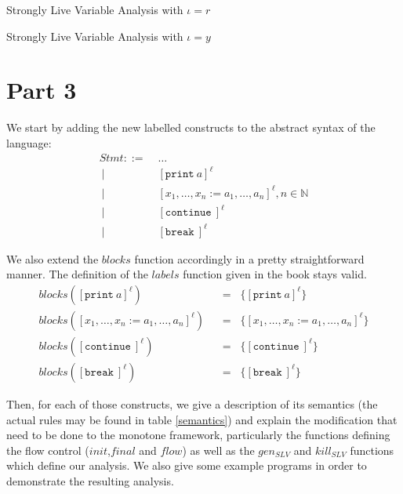 \documentclass[a4wide,12pt]{article}
\def\eq{\;\; = \;\;}
\def\N{\mathbb{N}}
\def\print{\texttt{print}\ }
\def\cont {\texttt{continue}\ }
\def\break{\texttt{break}\ }
\begin{document}
\begin{table}
\caption{Strongly Live Variable Analysis with $\iota = r$}
\begin{sideways}
\tiny

\end{sideways}
\end{table}
\begin{table}
\caption{Strongly Live Variable Analysis with $\iota = y$}
\begin{sideways}

\end{sideways}
\end{table}
 
\section{Part 3}
 
We start by adding the new labelled constructs to the abstract syntax of the language:
\begin{align*}
 Stmt ::= \; & \ldots \\
 ~ |\;\; & [\print a]^\ell \\
 ~ |\;\; & [x_1,\ldots,x_n := a_1,\ldots,a_n]^\ell , n \in \N \\
 ~ |\;\; & [\cont]^\ell \\
 ~ |\;\; & [\break]^\ell
\end{align*}
 
We also extend the $blocks$ function accordingly in a pretty straightforward manner. The definition
of the $labels$ function given in the book stays valid.
\begin{align*}
 blocks([\print a]^\ell) & \eq \{[\print a]^\ell\} \\
 blocks([x_1,\ldots,x_n := a_1,\ldots,a_n]^\ell) & \eq \{[x_1,\ldots,x_n := a_1,\ldots,a_n]^\ell\} \\
 blocks([\cont]^\ell) & \eq \{[\cont]^\ell\} \\
 blocks([\break]^\ell) & \eq \{[\break]^\ell\}
\end{align*}
 
 
Then, for each of those constructs, we give a description of its semantics (the actual rules may be found
in table \ref{semantics}) and explain the modification that need to be done
to the monotone framework, particularly the functions defining the flow control
($init$,$final$ and $flow$) as well as the $gen_{SLV}$ and $kill_{SLV}$ functions
which define our analysis. We also give some example
programs in order to demonstrate the resulting analysis.
 
\end{document}
